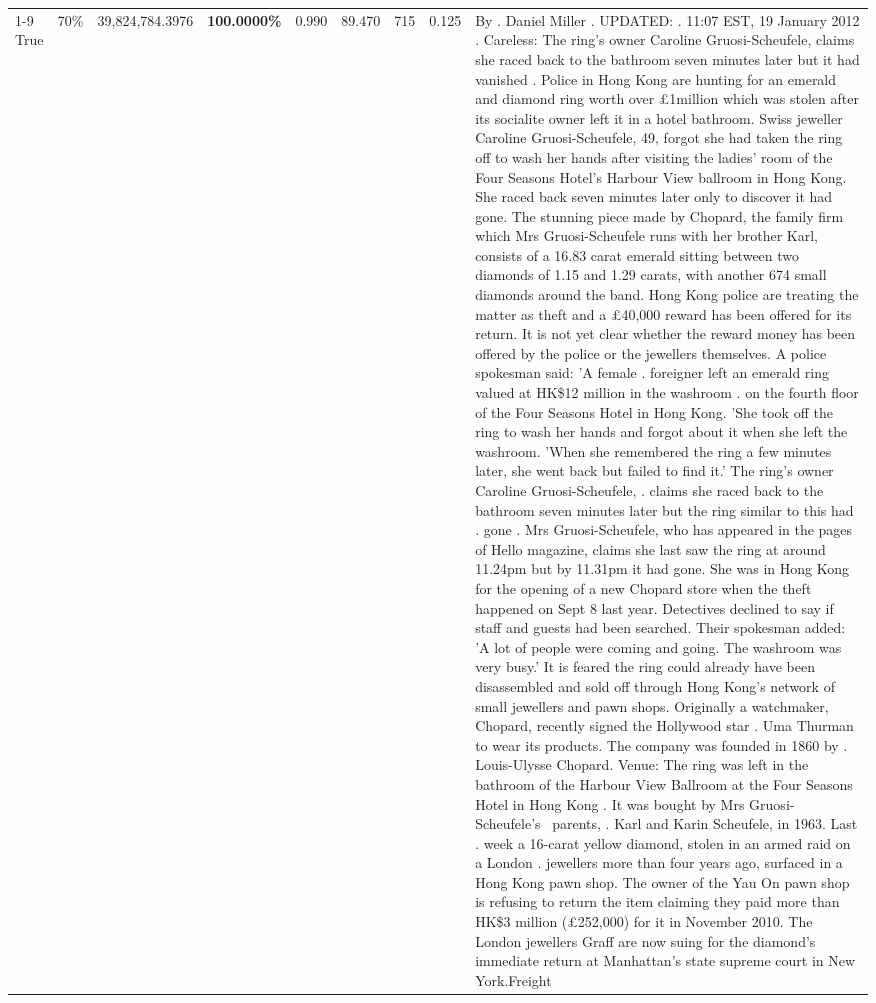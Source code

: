 \begin{table}[H]
\begin{tabular}{lllrlllll}
\cline{1-9} \cline{2-9}
True & 70\% & 39,824,784.3976 & \bfseries \color{red} 100.0000\% & 0.990 & 89.470 & 715 & 0.125 & By . Daniel Miller . UPDATED: . 11:07 EST, 19 January 2012 . Careless: The ring's owner Caroline Gruosi-Scheufele, claims she raced back to the bathroom seven minutes later but it had vanished . Police in Hong Kong are hunting for an emerald and diamond ring worth over £1million which was stolen after its socialite owner left it in a hotel bathroom. Swiss jeweller Caroline Gruosi-Scheufele, 49, forgot she had taken the ring off to wash her hands after visiting the ladies' room of the Four Seasons Hotel's Harbour View ballroom in Hong Kong. She raced back seven minutes later only to discover it had gone. The stunning piece made by Chopard, the family firm which Mrs Gruosi-Scheufele runs with her brother Karl, consists of a 16.83 carat emerald sitting between two diamonds of 1.15 and 1.29 carats, with another 674 small diamonds around the band. Hong Kong police are treating the matter as theft and a £40,000 reward has been offered for its return. It is not yet clear whether the reward money has been offered by the police or the jewellers themselves. A police spokesman said: 'A female . foreigner left an emerald ring valued at HK\$12 million in the washroom . on the fourth floor of the Four Seasons Hotel in Hong Kong. 'She took off the ring to wash her hands and forgot about it when she left the washroom. 'When she remembered the ring a few minutes later, she went back but failed to find it.' The ring's owner Caroline Gruosi-Scheufele, . claims she raced back to the bathroom seven minutes later but the ring similar to this had . gone . Mrs Gruosi-Scheufele, who has appeared in the pages of Hello magazine, claims she last saw the ring at around 11.24pm but by 11.31pm it had gone. She was in Hong Kong for the opening of a new Chopard store when the theft happened on Sept 8 last year. Detectives declined to say if staff and guests had been searched. Their spokesman added: 'A lot of people were coming and going. The washroom was very busy.' It is feared the ring could already have been disassembled and sold off through Hong Kong's network of small jewellers and pawn shops. Originally a watchmaker, Chopard, recently signed the Hollywood star . Uma Thurman to wear its products. The company was founded in 1860 by . Louis-Ulysse Chopard. Venue: The ring was left in the bathroom of the Harbour View Ballroom at the Four Seasons Hotel in Hong Kong . It was bought by Mrs Gruosi-Scheufele's  parents, . Karl and Karin Scheufele, in 1963. Last . week a 16-carat yellow diamond, stolen in an armed raid on a London . jewellers more than four years ago, surfaced in a Hong Kong pawn shop. The owner of the Yau On pawn shop is refusing to return the item claiming they paid more than HK\$3 million (£252,000) for it in November 2010. The London jewellers Graff are now suing for the diamond’s immediate return at Manhattan’s state supreme court in New York.Freight \\

\end{tabular}
\end{table}
